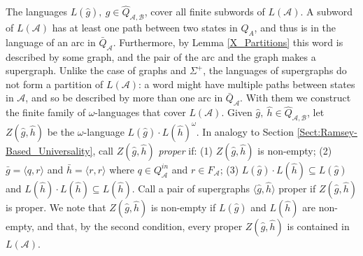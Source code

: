 \documentclass{LMCS}
\newcommand{\zug}[1]{\langle #1  \rangle}
\newcommand{\rzug}[1]{{\scriptstyle\langle} #1  {\scriptstyle\rangle}}
\newcommand{\A}{{\mathcal A}}
\newcommand{\B}{{\mathcal B}}
\newcommand{\arc}{\bar}
\newcommand{\superg}{\widehat}
\newcommand{\Z}[2]{\ensuremath{Z({\superg{#1},\superg{#2}})}}
\begin{document}
The languages $L(\superg{g}),~ \superg{g} \in \superg{Q}_{\A,\B}$, cover all
finite subwords of $L(\A)$. A subword of $L(\A)$ has at least one
path between two states in $Q_A$, and thus is in the language of an arc in
$\arc{Q}_\A$.  Furthermore, by Lemma \ref{X_Partitions} this word is described by some graph, and
the pair of the arc and the graph makes a supergraph. Unlike the case of graphs and
$\Sigma^+$, the languages of supergraphs do not form a partition of $L(\A)$: a
word might have multiple paths between states in $\A$, and so be described by
more than one arc in $\arc{Q}_\A$. With them we construct the finite family of
$\omega$-languages that cover $L(\A)$. Given $\superg{g},~ \superg{h} \in
\superg{Q}_{\A,\B}$, let $\Z{g}{h}$ be the $\omega$-language
$L(\superg{g})\cdot L(\superg{h})^\omega$. In analogy to Section
\ref{Sect:Ramsey-Based_Universality}, call $\Z{g}{h}$ \emph{proper}
if: (1) $\Z{g}{h}$ is non-empty; (2) $\arc{g}=\rzug{q,r}$ and
$\arc{h}=\rzug{r,r}$ where $q \in Q^{in}_\A$ and $r \in F_\A$; (3)
$L(\superg{g})\cdot L(\superg{h}) \subseteq L(\superg{g})$ and
$L(\superg{h})\cdot L(\superg{h}) \subseteq L(\superg{h})$.  Call a pair of
supergraphs $\zug{\superg{g}, \superg{h}}$ proper if $\Z{g}{h}$ is proper.  We
note that $\Z{g}{h}$ is non-empty if $L(\superg{g})$ and $L(\superg{h})$ are
non-empty, and that, by the second condition, every proper $\Z{g}{h}$ is
contained in $L(\A)$.
\end{document}
